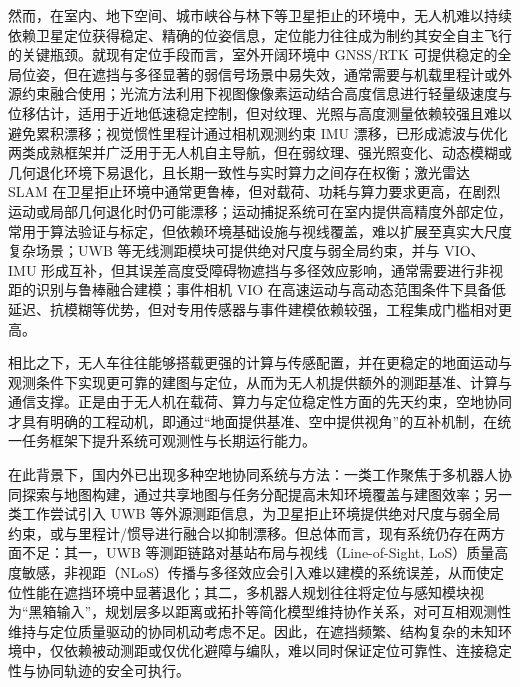 然而，在室内、地下空间、城市峡谷与林下等卫星拒止的环境中，无人机难以持续依赖卫星定位获得稳定、精确的位姿信息，定位能力往往成为制约其安全自主飞行的关键瓶颈。就现有定位手段而言，室外开阔环境中 GNSS/RTK 可提供稳定的全局位姿，但在遮挡与多径显著的弱信号场景中易失效，通常需要与机载里程计或外源约束融合使用\cite{groves2013gnssins}；光流方法利用下视图像像素运动结合高度信息进行轻量级速度与位移估计，适用于近地低速稳定控制，但对纹理、光照与高度测量依赖较强且难以避免累积漂移\cite{kendoul2009optic}；视觉惯性里程计通过相机观测约束 IMU 漂移，已形成滤波与优化两类成熟框架并广泛用于无人机自主导航，但在弱纹理、强光照变化、动态模糊或几何退化环境下易退化，且长期一致性与实时算力之间存在权衡\cite{qin2018vins,qin2019a,qin2019b,qin2018online}；激光雷达 SLAM 在卫星拒止环境中通常更鲁棒，但对载荷、功耗与算力要求更高，在剧烈运动或局部几何退化时仍可能漂移\cite{zhang2014loam,shan2020liosam,xu2021fastlio}；运动捕捉系统可在室内提供高精度外部定位，常用于算法验证与标定，但依赖环境基础设施与视线覆盖，难以扩展至真实大尺度复杂场景\cite{saldana2018apriltag}；UWB 等无线测距模块可提供绝对尺度与弱全局约束，并与 VIO、IMU 形成互补，但其误差高度受障碍物遮挡与多径效应影响，通常需要进行非视距的识别与鲁棒融合建模\cite{alarifi2016uwb,delama2023uvio}；事件相机 VIO 在高速运动与高动态范围条件下具备低延迟、抗模糊等优势，但对专用传感器与事件建模依赖较强，工程集成门槛相对更高\cite{rebecq2018ultimateslam,pl_evio}。

相比之下，无人车往往能够搭载更强的计算与传感配置，并在更稳定的地面运动与观测条件下实现更可靠的建图与定位，从而为无人机提供额外的测距基准、计算与通信支撑。正是由于无人机在载荷、算力与定位稳定性方面的先天约束，空地协同才具有明确的工程动机，即通过“地面提供基准、空中提供视角”的互补机制，在统一任务框架下提升系统可观测性与长期运行能力。

在此背景下，国内外已出现多种空地协同系统与方法：一类工作聚焦于多机器人协同探索与地图构建，通过共享地图与任务分配提高未知环境覆盖与建图效率\cite{agexplore1,agexplore2,agmap1,agmap2,无人机环境覆盖与探索规划方法综述}；另一类工作尝试引入 UWB 等外源测距信息，为卫星拒止环境提供绝对尺度与弱全局约束，或与里程计/惯导进行融合以抑制漂移\cite{uwbsurvey,queralta2020uwb,lin2023gnssuwb,jiang2024visionuwb}。但总体而言，现有系统仍存在两方面不足：其一，UWB 等测距链路对基站布局与视线（Line-of-Sight, LoS）质量高度敏感，非视距（NLoS）传播与多径效应会引入难以建模的系统误差，从而使定位性能在遮挡环境中显著退化\cite{zhao2022finding}；其二，多机器人规划往往将定位与感知模块视为“黑箱输入”，规划层多以距离或拓扑等简化模型维持协作关系，对可互相观测性维持与定位质量驱动的协同机动考虑不足\cite{amigoni2017survey,agexplore1,agmap1}。因此，在遮挡频繁、结构复杂的未知环境中，仅依赖被动测距或仅优化避障与编队，难以同时保证定位可靠性、连接稳定性与协同轨迹的安全可执行。

